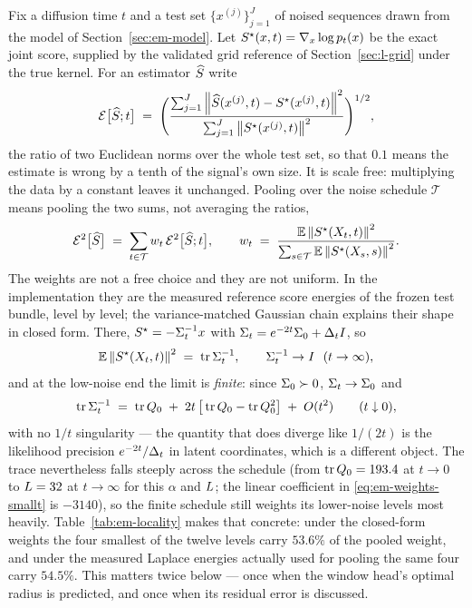Fix a diffusion time $t$ and a test set $\{x^{(j)}\}_{j=1}^{J}$ of noised
sequences drawn from the model of Section~\ref{sec:em-model}. Let
$S^{\star}(x,t) = \nabla_x \log p_t(x)$ be the exact joint score, supplied
by the validated grid reference of Section~\ref{sec:l-grid} under the true
kernel. For an estimator $\widehat{S}$ write
\begin{equation}
  \mathcal{E}\big[\widehat{S}; t\big]
  \;=\;
  \Bigg(
  \frac{\sum_{j=1}^{J}\left\lVert \widehat{S}(x^{(j)},t) - S^{\star}(x^{(j)},t) \right\rVert^2}
       {\sum_{j=1}^{J}\left\lVert S^{\star}(x^{(j)},t) \right\rVert^2}
  \Bigg)^{1/2},
  \label{eq:em-relerr}
\end{equation}
the ratio of two Euclidean norms over the whole test set, so that $0.1$ means
the estimate is wrong by a tenth of the signal's own size. It is scale free:
multiplying the data by a constant leaves it unchanged. Pooling over the noise
schedule $\mathcal{T}$ means pooling the two sums, not averaging the ratios,
\begin{equation}
  \mathcal{E}^2\big[\widehat{S}\big]
  \;=\;
  \sum_{t \in \mathcal{T}} w_t \,\mathcal{E}^2\big[\widehat{S}; t\big],
  \qquad
  w_t \;=\;
  \frac{\mathbb{E}\left\lVert S^{\star}(X_t,t) \right\rVert^2}{\sum_{s \in \mathcal{T}}\mathbb{E}\left\lVert S^{\star}(X_s,s) \right\rVert^2}.
  \label{eq:em-pooling}
\end{equation}
The weights are not a free choice and they are not uniform. In the
implementation they are the measured reference score energies of the frozen
test bundle, level by level; the variance-matched Gaussian chain explains
their shape in closed form. There, $S^{\star} = -\Sigma_t^{-1}x$ with
$\Sigma_t = e^{-2t}\Sigma_0 + \Delta_t I$, so
\begin{equation}
  \mathbb{E}\left\lVert S^{\star}(X_t,t) \right\rVert^2 \;=\; \operatorname{tr}\Sigma_t^{-1},
  \qquad
  \Sigma_t^{-1} \to I \ \ (t \to \infty),
  \label{eq:em-weights}
\end{equation}
and at the low-noise end the limit is \emph{finite}: since
$\Sigma_0 \succ 0$, $\Sigma_t \to \Sigma_0$ and
\begin{equation}
  \operatorname{tr}\Sigma_t^{-1}
  \;=\; \operatorname{tr}Q_0
  \;+\; 2t\,\big[\operatorname{tr}Q_0 - \operatorname{tr}Q_0^2\big]
  \;+\; O(t^2)
  \qquad (t \downarrow 0),
  \label{eq:em-weights-smallt}
\end{equation}
with no $1/t$ singularity --- the quantity that does diverge like $1/(2t)$ is
the likelihood precision $e^{-2t}/\Delta_t$ in latent coordinates, which is a
different object. The trace nevertheless falls steeply across the schedule
(from $\operatorname{tr}Q_0 = 193.4$ at $t \to 0$ to $L = 32$ at
$t \to \infty$ for this $\alpha$ and $L$; the linear coefficient in
\eqref{eq:em-weights-smallt} is $-3140$), so the finite schedule still
weights its lower-noise levels most heavily.
Table~\ref{tab:em-locality} makes that concrete: under the closed-form
weights the four smallest of the twelve levels carry $53.6\%$ of the pooled
weight, and under the measured Laplace energies actually used for pooling the
same four carry $54.5\%$. This matters twice
below --- once when the window head's optimal radius is predicted, and once when
its residual error is discussed.

